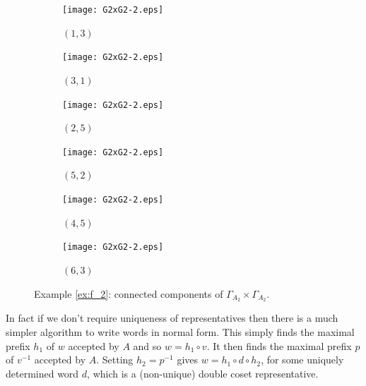 \documentclass[a4paper,12pt]{article}
\newcommand{\G}{\Gamma }
\numberwithin{equation}{section}
\numberwithin{figure}{section}
\begin{document}
\begin{figure}
\begin{center}




\begin{subfigure}[b]{.13\columnwidth}
\texttt{[image: G2xG2-2.eps]}
\caption{$(1,3)$}
\label{fig:G2xG2-2-1}
\end{subfigure}
\hspace{1mm}
\begin{subfigure}[b]{.13\columnwidth}
\texttt{[image: G2xG2-2.eps]}
\caption{$(3,1)$}
\label{fig:G2xG2-2-2}
\end{subfigure}
\hspace{1mm}
\begin{subfigure}[b]{.13\columnwidth}
\texttt{[image: G2xG2-2.eps]}
\caption{$(2,5)$}
\label{fig:G2xG2-2-3}
\end{subfigure}
\hspace{1mm}
\begin{subfigure}[b]{.13\columnwidth}
\texttt{[image: G2xG2-2.eps]}
\caption{$(5,2)$}
\label{fig:G2xG2-2-4}
\end{subfigure}
\hspace{1mm}
\begin{subfigure}[b]{.13\columnwidth}
\texttt{[image: G2xG2-2.eps]}
\caption{$(4,5)$}
\label{fig:G2xG2-2-5}
\end{subfigure}
\hspace{1mm}
\begin{subfigure}[b]{.13\columnwidth}
\texttt{[image: G2xG2-2.eps]}
\caption{$(6,3)$}
\label{fig:G2xG2-2-6}
\end{subfigure}
\end{center}
\caption{Example \ref{ex:f_2}: connected components of $\G_{A_2}\times \G_{A_2}$.}\label{fig:G2xG2-2}
\end{figure}

In fact if we don't require uniqueness of representatives then
there is a much simpler algorithm to write words in normal form.
This simply finds the maximal prefix $h_1$ of $w$  accepted  by
$A$  and so $w=h_1\circ v$. It then finds the maximal prefix $p$
of $v^{-1}$ accepted by $A$. Setting $h_2=p^{-1}$ gives
$w=h_1\circ d \circ h_2$, for some uniquely determined word $d$,
which is a (non-unique) double coset representative.
\end{document}
